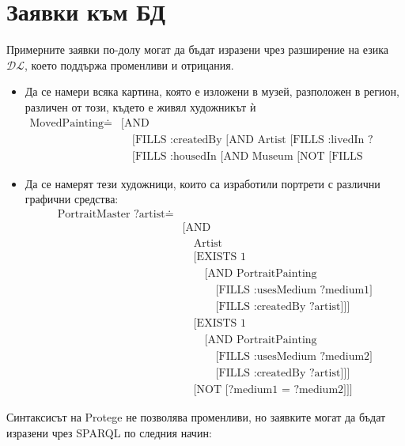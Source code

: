 \documentclass[a4paper, 11pt]{article}
\begin{document}
\section{Заявки към БД}
Примерните заявки по-долу могат да бъдат изразени чрез разширение на езика $\mathcal{DL}$, което поддържа променливи и отрицания\cite{halReasoningDescription}.
\begin{itemize}
  \item Да се намери всяка картина, която е изложени в музей, разположен  в регион, различен от този, където е живял художникът ѝ
    \begin{align*}
      \text{MovedPainting} \doteq
      &\text{[AND}\\
      &\quad\text{[FILLS :createdBy [AND Artist [FILLS :livedIn ?artistRegion]]]}\\
      &\quad\text{[FILLS :housedIn [AND Museum [NOT [FILLS :locatedIn ?artistRegion]]]]]}
    \end{align*}
  \item Да се намерят тези художници, които са изработили портрети с различни графични средства:
  \begin{align*}
    \text{PortraitMaster ?artist} \doteq \\
    &\text{[AND} \\
    &\quad \text{Artist} \\
    &\quad \text{[EXISTS 1} \\
    &\quad \quad \text{[AND PortraitPainting} \\
    &\quad \quad \quad \text{[FILLS :usesMedium ?medium1]} \\
    &\quad \quad \quad \text{[FILLS :createdBy ?artist]]]} \\
    &\quad \text{[EXISTS 1} \\
    &\quad \quad \text{[AND PortraitPainting} \\
    &\quad \quad \quad \text{[FILLS :usesMedium ?medium2]} \\
    &\quad \quad \quad \text{[FILLS :createdBy ?artist]]]}\\
    &\quad \text{[NOT [?medium1 = ?medium2]]]}
  \end{align*}
\end{itemize}
\pagebreak
Синтаксисът на Protege не позволява променливи, но заявките могат да бъдат изразени чрез SPARQL по следния начин:
\end{document}
